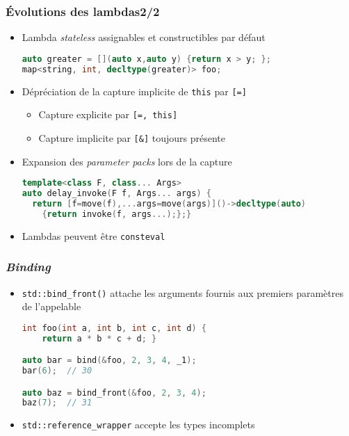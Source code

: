 \documentclass[C++.tex]{subfiles}
\begin{document}
\begin{frame}[fragile]
	\frametitle{Évolutions des lambdas\titlehfill{}2/2}
	\begin{itemize}
		\item Lambda \textit{stateless} assignables et constructibles par défaut


		\begin{lstlisting}[language=C++]
auto greater = [](auto x,auto y) {return x > y; };
map<string, int, decltype(greater)> foo;\end{lstlisting}

		\item Dépréciation de la capture implicite de \lstinline|this| par \lstinline|[=]|
		\begin{itemize}
			\item Capture explicite par \lstinline|[=, this]|
			\item Capture implicite par \lstinline|[&]| toujours présente
		\end{itemize}
		\item Expansion des \textit{parameter packs} lors de la capture

		\begin{lstlisting}[language=C++]
template<class F, class... Args>
auto delay_invoke(F f, Args... args) {
  return [f=move(f),...args=move(args)]()->decltype(auto) 
    {return invoke(f, args...);};}\end{lstlisting}

		\item Lambdas peuvent être \lstinline|consteval|
	\end{itemize}
\end{frame}

\begin{frame}[fragile]
	\frametitle{\textit{Binding}}
	\begin{itemize}
		\item \lstinline|std::bind_front()| attache les arguments fournis aux premiers paramètres de l'appelable

	\begin{lstlisting}[language=C++]
int foo(int a, int b, int c, int d) {
	return a * b * c + d; }

auto bar = bind(&foo, 2, 3, 4, _1);
bar(6);  // 30

auto baz = bind_front(&foo, 2, 3, 4);
baz(7);  // 31\end{lstlisting}

		\item \lstinline|std::reference_wrapper| accepte les types incomplets

	\end{itemize}
\end{frame}
\end{document}
